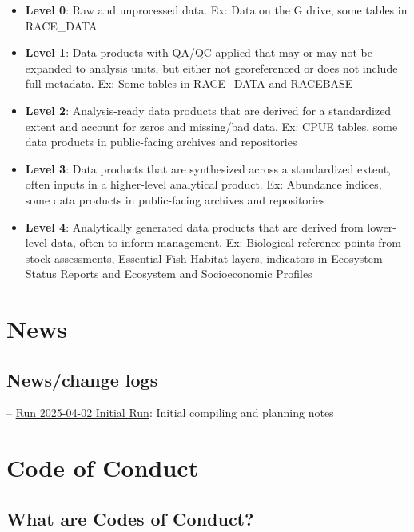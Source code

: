 \documentclass[
  letterpaper,
  oneside,
  open=any]{scrbook}
\providecommand{\tightlist}{%
  \setlength{\itemsep}{0pt}\setlength{\parskip}{0pt}}\usepackage{longtable,booktabs,array}
\begin{document}
\begin{itemize}
\tightlist
\item
  \textbf{Level 0}: Raw and unprocessed data. Ex: Data on the G drive,
  some tables in RACE\_DATA
\item
  \textbf{Level 1}: Data products with QA/QC applied that may or may not
  be expanded to analysis units, but either not georeferenced or does
  not include full metadata. Ex: Some tables in RACE\_DATA and RACEBASE
\item
  \textbf{Level 2}: Analysis-ready data products that are derived for a
  standardized extent and account for zeros and missing/bad data. Ex:
  CPUE tables, some data products in public-facing archives and
  repositories
\item
  \textbf{Level 3}: Data products that are synthesized across a
  standardized extent, often inputs in a higher-level analytical
  product. Ex: Abundance indices, some data products in public-facing
  archives and repositories
\item
  \textbf{Level 4}: Analytically generated data products that are
  derived from lower-level data, often to inform management. Ex:
  Biological reference points from stock assessments, Essential Fish
  Habitat layers, indicators in Ecosystem Status Reports and Ecosystem
  and Socioeconomic Profiles
\end{itemize}

\chapter{News}\label{news}

\section{News/change logs}\label{newschange-logs}

--
\href{https://raw.githubusercontent.com/IEA-Data/IEA_Data_Guidance_Doc/main/content/intro-news/2025-04-02.txt}{Run
2025-04-02 Initial Run}: Initial compiling and planning notes

\chapter{Code of Conduct}\label{code-of-conduct}

\section{What are Codes of Conduct?}\label{what-are-codes-of-conduct}
\end{document}

